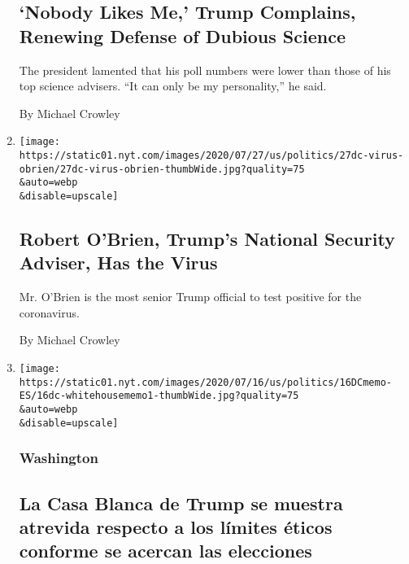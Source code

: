 \begin{enumerate}
  \hypertarget{nobody-likes-me-trump-complains-renewing-defense-of-dubious-science}{%
  \subsection{`Nobody Likes Me,' Trump Complains, Renewing Defense of
  Dubious
  Science}\label{nobody-likes-me-trump-complains-renewing-defense-of-dubious-science}}

  The president lamented that his poll numbers were lower than those of
  his top science advisers. ``It can only be my personality,'' he said.

  By Michael Crowley
\item
  \href{/2020/07/27/us/politics/robert-obrien-virus.html}{}

  \texttt{[image: https://static01.nyt.com/images/2020/07/27/us/politics/27dc-virus-obrien/27dc-virus-obrien-thumbWide.jpg?quality=75\\\&auto=webp\\\&disable=upscale]}

  \hypertarget{robert-obrien-trumps-national-security-adviser-has-the-virus}{%
  \subsection{Robert O'Brien, Trump's National Security Adviser, Has the
  Virus}\label{robert-obrien-trumps-national-security-adviser-has-the-virus}}

  Mr. O'Brien is the most senior Trump official to test positive for the
  coronavirus.

  By Michael Crowley
\item
  \href{/es/2020/07/16/espanol/estados-unidos/goya-trump-ivanka.html}{}

  \texttt{[image: https://static01.nyt.com/images/2020/07/16/us/politics/16DCmemo-ES/16dc-whitehousememo1-thumbWide.jpg?quality=75\\\&auto=webp\\\&disable=upscale]}

  \hypertarget{washington}{%
  \subsubsection{Washington}\label{washington}}

  \hypertarget{la-casa-blanca-de-trump-se-muestra-atrevida-respecto-a-los-luxedmites-uxe9ticos-conforme-se-acercan-las-elecciones}{%
  \subsection{La Casa Blanca de Trump se muestra atrevida respecto a los
  límites éticos conforme se acercan las
  elecciones}\label{la-casa-blanca-de-trump-se-muestra-atrevida-respecto-a-los-luxedmites-uxe9ticos-conforme-se-acercan-las-elecciones}}


\end{enumerate}
